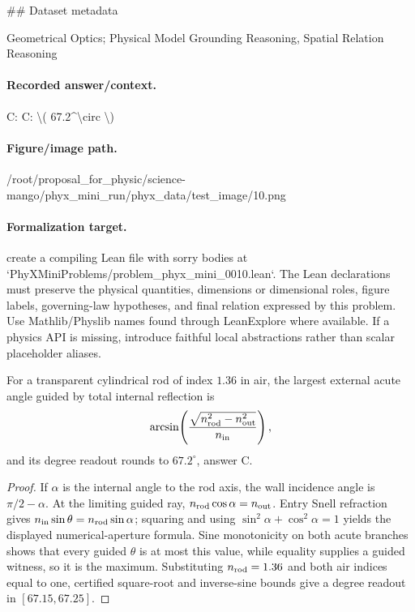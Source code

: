\#\# Dataset metadata

Geometrical Optics; Physical Model Grounding Reasoning, Spatial Relation Reasoning

\paragraph{Recorded answer/context.}
C: C: \textbackslash{}( 67.2\textasciicircum{}\textbackslash{}circ \textbackslash{})

\paragraph{Figure/image path.}
/root/proposal\_for\_physic/science-mango/phyx\_mini\_run/phyx\_data/test\_image/10.png

\paragraph{Formalization target.}
create a compiling Lean file with sorry bodies at `PhyXMiniProblems/problem\_phyx\_mini\_0010.lean`. The Lean declarations must preserve the physical quantities, dimensions or dimensional roles, figure labels, governing-law hypotheses, and final relation expressed by this problem.
Use Mathlib/Physlib names found through LeanExplore where available. If a physics API is missing, introduce faithful local abstractions rather than scalar placeholder aliases.

\begin{theorem}
\label{thm:physics:phyx_mini_0010:target}
For a transparent cylindrical rod of index \(1.36\) in air, the largest
external acute angle guided by total internal reflection is
\[
\arcsin\!\left(\frac{\sqrt{n_{\rm rod}^2-n_{\rm out}^2}}
 {n_{\rm in}}\right),
\]
and its degree readout rounds to \(67.2^\circ\), answer C.
\end{theorem}
\begin{proof}
If \(\alpha\) is the internal angle to the rod axis, the wall incidence angle
is \(\pi/2-\alpha\).  At the limiting guided ray,
\(n_{\rm rod}\cos\alpha=n_{\rm out}\).  Entry Snell refraction gives
\(n_{\rm in}\sin\theta=n_{\rm rod}\sin\alpha\); squaring and using
\(\sin^2\alpha+\cos^2\alpha=1\) yields the displayed numerical-aperture
formula.  Sine monotonicity on both acute branches shows that every guided
\(\theta\) is at most this value, while equality supplies a guided witness,
so it is the maximum.  Substituting \(n_{\rm rod}=1.36\) and both air indices
equal to one, certified square-root and inverse-sine bounds give a degree
readout in \([67.15,67.25]\).
\end{proof}


